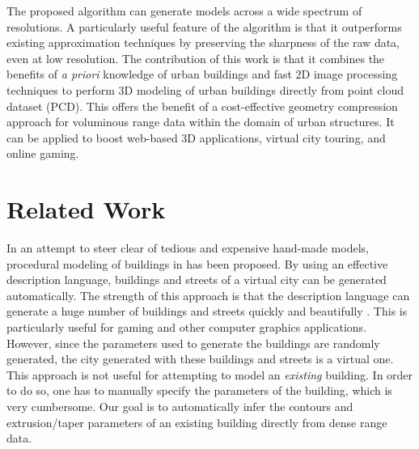 \documentclass[10pt,journal,cspaper,compsoc]{IEEEtran}
\begin{document}
The proposed algorithm can generate models across a wide spectrum of
resolutions.
A particularly useful feature of the algorithm is that it outperforms
existing approximation techniques by preserving the sharpness of the raw
data, even at low resolution.
The contribution of this work is that it combines the benefits of
\emph{a priori} knowledge of urban buildings and fast 2D image
processing techniques to perform 3D modeling of urban buildings directly
from point cloud dataset (PCD).
This offers the benefit of a cost-effective geometry compression
approach for voluminous range data within the domain of urban structures.
It can be applied to boost web-based 3D applications, virtual city touring,
and online gaming.

\section{Related Work}

In an attempt to steer clear of tedious and expensive hand-made models,
procedural modeling of buildings in \cite{PMB_MWH} has been proposed.
By using an effective description language, buildings and streets of a virtual
city can be generated automatically.
The strength of this approach is that the description language can generate
a huge number of buildings and streets quickly and beautifully \cite{PMB_PM}.
This is particularly useful for gaming and other computer graphics applications.
However, since the parameters used to generate the buildings are randomly
generated, the city generated with these buildings and streets is a virtual one.
This approach is not useful for attempting to model an {\it existing} building.
In order to do so, one has to manually specify the parameters of the building,
which is very cumbersome.
Our goal is to automatically infer the contours and extrusion/taper parameters
of an existing building directly from dense range data.
\end{document}
